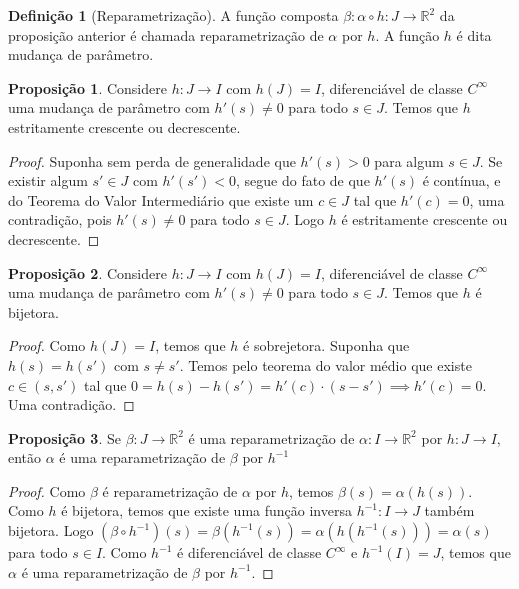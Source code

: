 \documentclass[12pt,leqno,twoside]{amsart}
\theoremstyle{definition}
\newtheorem{proposicao}{Proposição}[section]
\newtheorem{definicao}{Definição}[section]
\begin{document}
\vspace{0.2cm}

\begin{definicao}[Reparametrização]
	A função composta $\beta:\alpha \circ h:J\to \mathbb{R}^2$ da proposição anterior é chamada reparametrização de $\alpha$ por $h$. A função $h$ é dita mudança de parâmetro.
\end{definicao}


\vspace{0.2cm}


\begin{proposicao}
	Considere  $h:J\to I$ com $h(J) = I$, diferenciável de classe $C^{\infty}$ uma mudança de parâmetro com $h'(s) \neq 0$ para todo $s\in J$. Temos que $h$ estritamente crescente ou decrescente.
\end{proposicao}
\begin{proof}
	 Suponha sem perda de generalidade que $h'(s) > 0$ para algum $s\in J$. Se existir algum $s'\in J$ com $h'(s') < 0$, segue do fato de que  $h'(s)$ é contínua, e do  Teorema do Valor Intermediário que existe um $c\in J$ tal que $h'(c) = 0$, uma contradição, pois  $h'(s) \neq 0$ para todo $s\in J$. Logo $h$ é estritamente crescente ou decrescente.
\end{proof}


\vspace{0.2cm}


\begin{proposicao}
	Considere  $h:J\to I$ com $h(J) = I$, diferenciável de classe $C^{\infty}$ uma mudança de parâmetro com $h'(s) \neq 0$ para todo $s\in J$. Temos que $h$ é bijetora.
\end{proposicao}
\begin{proof}
	Como $h(J) = I$, temos que $h$ é sobrejetora. Suponha que $h(s) = h(s')$ com $s\neq s'$. Temos pelo teorema do valor médio que existe $c\in (s,s')$ tal que $ 0 = h(s) - h(s') = h'(c) \cdot(s-s') \implies h'(c) = 0$. Uma contradição.
\end{proof}


\vspace{0.2cm}


\begin{proposicao}
	Se $\beta: J \to \mathbb{R}^2$ é uma reparametrização de $\alpha:I\to \mathbb{R}^2$ por $h:J\to I$, então $\alpha$ é uma reparametrização de $\beta$ por $h^{-1}$
\end{proposicao}
\begin{proof}
	Como $\beta$ é reparametrização de $\alpha$ por $h$, temos $\beta(s) = \alpha(h(s))$. Como $h$ é bijetora, temos que existe uma função inversa $h^{-1}: I\to J$ também bijetora. Logo $\left(\beta \circ h^{-1}\right) (s)  = \beta(h^{-1}(s)) =  \alpha(h(h^{-1}(s)))  = \alpha(s)$ para todo $s\in I$. Como $h^{-1}$ é diferenciável de classe $C^{\infty}$ e $h^{-1}(I) = J$, temos que $\alpha$ é uma reparametrização de $\beta$ por $h^{-1}$.
\end{proof}
\end{document}
